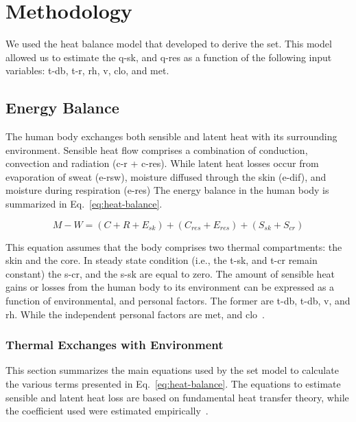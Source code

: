 
\section{Methodology}\label{sec:methodology}

We used the heat balance model that  developed to derive the \ac{set}.
This model allowed us to estimate the \ac{q-sk}, and \ac{q-res} as a function of the following input variables: \ac{t-db}, \ac{t-r}, \ac{rh}, \ac{v}, \ac{clo}, and \ac{met}.

\subsection{Energy Balance}\label{subsec:energy-balance}

The human body exchanges both sensible and latent heat with its surrounding environment.
Sensible heat flow comprises a combination of conduction, convection and radiation (\acs{c-r} + \acs{c-res}).
While latent heat losses occur from evaporation of sweat  (\acs{e-rsw}), moisture diffused through the skin  (\acs{e-dif}), and moisture during respiration (\acs{e-res})
The energy balance in the human body is summarized in Eq.~\ref{eq:heat-balance}.

\begin{equation}
    M - W = (C + R + E_{sk}) + (C_{res} + E_{res}) + (S_{sk} + S_{cr})\label{eq:heat-balance}
\end{equation}

This equation assumes that the body comprises two thermal compartments: the skin and the core.
In steady state condition (i.e., the \ac{t-sk}, and \ac{t-cr} remain constant) the \ac{s-cr}, and the \ac{s-sk} are equal to zero.
The amount of sensible heat gains or losses from the human body to its environment can be expressed as a function of environmental, and personal factors.
The former are \ac{t-db}, \ac{t-db}, \ac{v}, and \ac{rh}.
While the independent personal factors are \ac{met}, and \ac{clo}~\cite{ASHRA2017}.

\subsubsection{Thermal Exchanges with Environment}\label{subsubsec:thermal-exchanges-with-environment}

This section summarizes the main equations used by the \ac{set} model to calculate the various terms presented in Eq.~\ref{eq:heat-balance}.
The equations to estimate sensible and latent heat loss are based on fundamental heat transfer theory, while the coefficient used were estimated empirically~\cite{ASHRA2017}.

